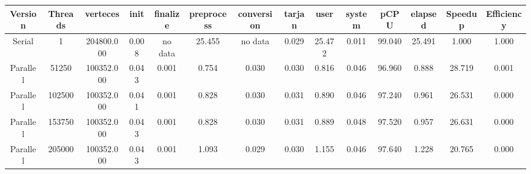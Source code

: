 \begin{tabular}{|c|c|c|c|c|c|c|c|c|c|c|c|c|c|}
\toprule
 Version &  Threads &   verteces &  init & finalize &  preprocess & conversion &  tarjan &   user &  system &   pCPU &  elapsed &  Speedup &  Efficiency \\
\midrule
  Serial &        1 & 204800.000 & 0.008 &  no data &      25.455 &    no data &   0.029 & 25.472 &   0.011 & 99.040 &   25.491 &    1.000 &       1.000 \\
Parallel &    51250 & 100352.000 & 0.043 &    0.001 &       0.754 &      0.030 &   0.030 &  0.816 &   0.046 & 96.960 &    0.888 &   28.719 &       0.001 \\
Parallel &   102500 & 100352.000 & 0.041 &    0.001 &       0.828 &      0.030 &   0.031 &  0.890 &   0.046 & 97.240 &    0.961 &   26.531 &       0.000 \\
Parallel &   153750 & 100352.000 & 0.043 &    0.001 &       0.828 &      0.030 &   0.031 &  0.889 &   0.048 & 97.520 &    0.957 &   26.631 &       0.000 \\
Parallel &   205000 & 100352.000 & 0.043 &    0.001 &       1.093 &      0.029 &   0.030 &  1.155 &   0.046 & 97.640 &    1.228 &   20.765 &       0.000 \\
\bottomrule
\end{tabular}
